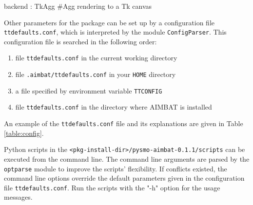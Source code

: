 \documentclass[12pt, titlepage]{article}
\newenvironment{lyxcode}
{\begin{list}{}{
\setlength{\rightmargin}{\leftmargin}
\setlength{\listparindent}{0pt}%
\raggedright
\setlength{\itemsep}{0pt}
\setlength{\parsep}{0pt}
\normalfont\ttfamily}%
 \item[]}
{\end{list}}
\begin{document}
\begin{lyxcode}
backend : TkAgg  \#Agg rendering to a Tk canvas 
\end{lyxcode}


Other parameters for the package can be set up by a configuration file \texttt{ttdefaults.conf}, which is interpreted by the module \texttt{ConfigParser}. 
This configuration file is searched in the following order:
\begin{enumerate}[(1)]
	\item file \texttt{ttdefaults.conf} in the current working directory
	\item file \texttt{.aimbat/ttdefaults.conf} in your \texttt{HOME} directory
	\item a file specified by environment variable \texttt{TTCONFIG} 
	\item file \texttt{ttdefaults.conf} in the directory where AIMBAT is installed 
\end{enumerate}

An example of the \texttt{ttdefaults.conf} file and its explanations are given in Table \ref{table:config}.

Python scripts in the \texttt{<pkg-install-dir>/pysmo-aimbat-0.1.1/scripts} can be executed from the command line. 
The command line arguments are parsed by the \texttt{optparse} module to improve the scripts' flexibility. 
If conflicts existed, the command line options override the default parameters given in the configuration file \texttt{ttdefaults.conf}.
Run the scripts with the "-h" option for the usage messages.
\end{document}
